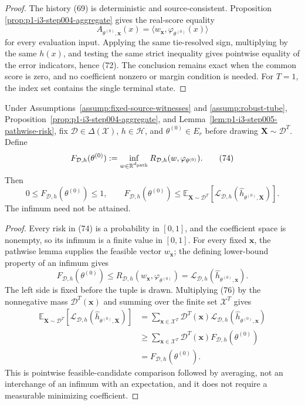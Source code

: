\begin{proof}
The history (69) is deterministic and source-consistent.  Proposition
\ref{prop:p1-i3-step004-aggregate} gives the real-score equality
\[
A_{\theta^{(0)},\mathbf x}(x)
=\langle w_{\mathbf x},\varphi_{\theta^{(0)}}(x)\rangle
\tag{73}
\]
for every evaluation input.  Applying the same tie-resolved sign, multiplying
by the same $h(x)$, and testing the same strict inequality gives pointwise
equality of the error indicators, hence (72).  The conclusion remains exact
when the common score is zero, and no coefficient nonzero or margin condition
is needed.  For $T=1$, the index set contains the single terminal state.
\end{proof}

\begin{proposition}
\label{prop:p1-i3-step005-conditional-comparison}
Under Assumptions~\ref{assump:fixed-source-witnesses} and
\ref{assump:robust-tube}, Proposition~\ref{prop:p1-i3-step004-aggregate},
and Lemma~\ref{lem:p1-i3-step005-pathwise-risk}, fix
$\mathcal D\in\Delta(\mathcal X)$, $h\in\mathcal H$, and
$\theta^{(0)}\in E_r$ before drawing $\mathbf X\sim\mathcal D^T$.  Define
\[
F_{\mathcal D,h}(\theta^{(0)}):=
\inf_{w\in\mathbb R^{d_{\rm path}}}
R_{\mathcal D,h}(w,\varphi_{\theta^{(0)}}).
\tag{74}
\]
Then
\[
0\leq F_{\mathcal D,h}(\theta^{(0)})\leq1,
\qquad
F_{\mathcal D,h}(\theta^{(0)})
\leq\mathbb E_{\mathbf X\sim\mathcal D^T}
\left[\mathcal L_{\mathcal D,h}
(\widehat h_{\theta^{(0)},\mathbf X})\right].
\tag{75}
\]
The infimum need not be attained.
\end{proposition}

\begin{proof}
Every risk in (74) is a probability in $[0,1]$, and the coefficient space is
nonempty, so its infimum is a finite value in $[0,1]$.  For every fixed
$\mathbf x$, the pathwise lemma supplies the feasible vector $w_{\mathbf x}$;
the defining lower-bound property of an infimum gives
\[
F_{\mathcal D,h}(\theta^{(0)})
\leq R_{\mathcal D,h}(w_{\mathbf x},\varphi_{\theta^{(0)}})
=\mathcal L_{\mathcal D,h}
(\widehat h_{\theta^{(0)},\mathbf x}).
\tag{76}
\]
The left side is fixed before the tuple is drawn.  Multiplying (76) by the
nonnegative mass $\mathcal D^T(\mathbf x)$ and summing over the finite set
$\mathcal X^T$ gives
\[
\begin{aligned}
\mathbb E_{\mathbf X\sim\mathcal D^T}
\left[\mathcal L_{\mathcal D,h}
(\widehat h_{\theta^{(0)},\mathbf X})\right]
&=\sum_{\mathbf x\in\mathcal X^T}\mathcal D^T(\mathbf x)
\mathcal L_{\mathcal D,h}(\widehat h_{\theta^{(0)},\mathbf x})\\
&\geq\sum_{\mathbf x\in\mathcal X^T}\mathcal D^T(\mathbf x)
F_{\mathcal D,h}(\theta^{(0)})\\
&=F_{\mathcal D,h}(\theta^{(0)}).
\end{aligned}
\tag{77}
\]
This is pointwise feasible-candidate comparison followed by averaging, not an
interchange of an infimum with an expectation, and it does not require a
measurable minimizing coefficient.
\end{proof}


